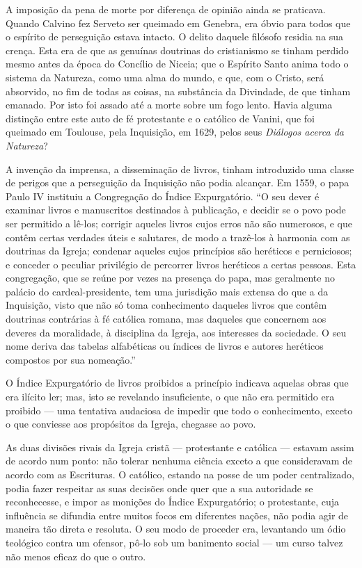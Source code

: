 \documentclass[11pt,a5paper,twoside,openany]{book}
\begin{document}
A imposição da pena de morte por diferença de opinião ainda se praticava. Quando Calvino fez Serveto ser queimado em Genebra, era óbvio para todos que o espírito de perseguição estava intacto. O delito daquele filósofo residia na sua crença. Esta era de que as genuínas doutrinas do cristianismo se tinham perdido mesmo antes da época do Concílio de Niceia; que o Espírito Santo anima todo o sistema da Natureza, como uma alma do mundo, e que, com o Cristo, será absorvido, no fim de todas as coisas, na substância da Divindade, de que tinham emanado. Por isto foi assado até a morte sobre um fogo lento. Havia alguma distinção entre este auto de fé protestante e o católico de Vanini, que foi queimado em Toulouse, pela Inquisição, em 1629, pelos seus \textit{Diálogos acerca da Natureza}?

A invenção da imprensa, a disseminação de livros, tinham introduzido uma classe de perigos que a perseguição da Inquisição não podia alcançar. Em 1559, o papa Paulo IV instituiu a Congregação do Índice Expurgatório. “O seu dever é examinar livros e manuscritos destinados à publicação, e decidir se o povo pode ser permitido a lê-los; corrigir aqueles livros cujos erros não são numerosos, e que contêm certas verdades úteis e salutares, de modo a trazê-los à harmonia com as doutrinas da Igreja; condenar aqueles cujos princípios são heréticos e perniciosos; e conceder o peculiar privilégio de percorrer livros heréticos a certas pessoas. Esta congregação, que se reúne por vezes na presença do papa, mas geralmente no palácio do cardeal-presidente, tem uma jurisdição mais extensa do que a da Inquisição, visto que não só toma conhecimento daqueles livros que contêm doutrinas contrárias à fé católica romana, mas daqueles que concernem aos deveres da moralidade, à disciplina da Igreja, aos interesses da sociedade. O seu nome deriva das tabelas alfabéticas ou índices de livros e autores heréticos compostos por sua nomeação.”

O Índice Expurgatório de livros proibidos a princípio indicava aquelas obras que era ilícito ler; mas, isto se revelando insuficiente, o que não era permitido era proibido — uma tentativa audaciosa de impedir que todo o conhecimento, exceto o que conviesse aos propósitos da Igreja, chegasse ao povo.

As duas divisões rivais da Igreja cristã — protestante e católica — estavam assim de acordo num ponto: não tolerar nenhuma ciência exceto a que consideravam de acordo com as Escrituras. O católico, estando na posse de um poder centralizado, podia fazer respeitar as suas decisões onde quer que a sua autoridade se reconhecesse, e impor as monições do Índice Expurgatório; o protestante, cuja influência se difundia entre muitos focos em diferentes nações, não podia agir de maneira tão direta e resoluta. O seu modo de proceder era, levantando um ódio teológico contra um ofensor, pô-lo sob um banimento social — um curso talvez não menos eficaz do que o outro.
\end{document}
